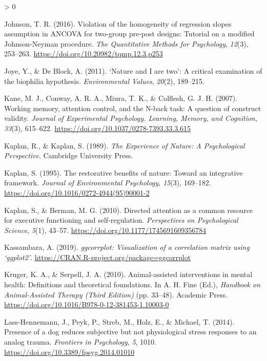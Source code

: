 \documentclass[
  english,
  pub,floatsintext]{apa6}
\newlength{\cslhangindent}
\newenvironment{CSLReferences}[2] %
 {%
  \setlength{\parindent}{0pt}
  \ifodd #1 \everypar{\setlength{\hangindent}{\cslhangindent}}\ignorespaces\fi
  \ifnum #2 > 0
  \setlength{\parskip}{#2\baselineskip}
  \fi
 }%
 {}
\begin{document}
\begin{CSLReferences}{1}{0}
\leavevmode\hypertarget{ref-Johnson.2016}{}%
Johnson, T. R. (2016). Violation of the homogeneity of regression slopes assumption in {ANCOVA} for two-group pre-post designs: {Tutorial} on a modified {Johnson}-{Neyman} procedure. \emph{The Quantitative Methods for Psychology}, \emph{12}(3), 253--263. \url{https://doi.org/10.20982/tqmp.12.3.p253}

\leavevmode\hypertarget{ref-Joye.DeBlock.2011}{}%
Joye, Y., \& De Block, A. (2011). {`{Nature} and {I} are two'}: {A} critical examination of the biophilia hypothesis. \emph{Environmental Values}, \emph{20}(2), 189--215.

\leavevmode\hypertarget{ref-Kane.etal.2007}{}%
Kane, M. J., Conway, A. R. A., Miura, T. K., \& Colflesh, G. J. H. (2007). Working memory, attention control, and the {N}-back task: A question of construct validity. \emph{Journal of Experimental Psychology. Learning, Memory, and Cognition}, \emph{33}(3), 615--622. \url{https://doi.org/10.1037/0278-7393.33.3.615}

\leavevmode\hypertarget{ref-Kaplan.Kaplan.1989}{}%
Kaplan, R., \& Kaplan, S. (1989). \emph{The {Experience} of {Nature}: {A Psychological Perspective}}. {Cambridge University Press}.

\leavevmode\hypertarget{ref-Kaplan.1995}{}%
Kaplan, S. (1995). The restorative benefits of nature: {Toward} an integrative framework. \emph{Journal of Environmental Psychology}, \emph{15}(3), 169--182. \url{https://doi.org/10.1016/0272-4944(95)90001-2}

\leavevmode\hypertarget{ref-Kaplan.Berman.2010}{}%
Kaplan, S., \& Berman, M. G. (2010). Directed attention as a common resource for executive functioning and self-regulation. \emph{Perspectives on Psychological Science}, \emph{5}(1), 43--57. \url{https://doi.org/10.1177/1745691609356784}

\leavevmode\hypertarget{ref-R-ggcorrplot}{}%
Kassambara, A. (2019). \emph{{ggcorrplot}: Visualization of a correlation matrix using {`ggplot2'}}. \url{https://CRAN.R-project.org/package=ggcorrplot}

\leavevmode\hypertarget{ref-Kruger.Serpell.2010}{}%
Kruger, K. A., \& Serpell, J. A. (2010). Animal-assisted interventions in mental health: Definitions and theoretical foundations. In A. H. Fine (Ed.), \emph{Handbook on {Animal}-{Assisted Therapy} ({Third Edition})} (pp. 33--48). {Academic Press}. \url{https://doi.org/10.1016/B978-0-12-381453-1.10003-0}

\leavevmode\hypertarget{ref-Lass-Hennemann.etal.2014}{}%
Lass-Hennemann, J., Peyk, P., Streb, M., Holz, E., \& Michael, T. (2014). Presence of a dog reduces subjective but not physiological stress responses to an analog trauma. \emph{Frontiers in Psychology}, \emph{5}, 1010. \url{https://doi.org/10.3389/fpsyg.2014.01010}


\end{CSLReferences}
\end{document}
